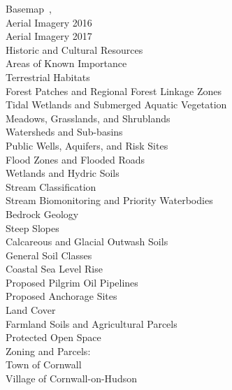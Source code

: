 Basemap\dotfill~\pageref{map:basemap}, ~\pageref{map:basemap}\\
Aerial Imagery 2016\dotfill~\pageref{map:aerialimagery2016}\\
Aerial Imagery 2017\dotfill~\pageref{map:aerialimagery2017}\\
Historic and Cultural 
Resources\dotfill~\pageref{map:historicandculturalresources}\\
Areas of Known Importance\dotfill~\pageref{map:aok}\\
Terrestrial Habitats\dotfill~\pageref{map:terrestrialhabitats}\\
Forest Patches and Regional Forest Linkage 
Zones\dotfill~\pageref{map:forestpatches} \\
Tidal Wetlands and Submerged Aquatic 
Vegetation\dotfill~\pageref{map:tidalwetlandsandSAV}\\
Meadows, Grasslands, and 
Shrublands\dotfill~\pageref{map:meadowgrasslandsandshrublands}\\
Watersheds and Sub-basins\dotfill~\pageref{map:watershedsandsubbasins}\\
Public Wells, Aquifers, and Risk Sites\dotfill~\pageref{map:wells}\\
Flood Zones and Flooded Roads\dotfill~\pageref{map:floodzonesandfloodedroads}\\
Wetlands and Hydric Soils\dotfill~\pageref{map:wetlandsandhydricsoils}\\
Stream Classification\dotfill~\pageref{map:streamclassifications}\\
Stream Biomonitoring and Priority Waterbodies 
\dotfill~\pageref{map:biomonitoringandprioritywaterbodies}\\
Bedrock Geology\dotfill~\pageref{map:bedrockgeology}\\
Steep Slopes\dotfill~\pageref{map:steepslopes}\\
Calcareous and Glacial Outwash Soils \dotfill 
~\pageref{map:calcaerousandglacialoutwashsoils}\\
General Soil Classes\dotfill~\pageref{map:generalsoilclasses}\\
Coastal Sea Level Rise\dotfill~\pageref{map:coastalclimatechange}\\
Proposed Pilgrim Oil Pipelines\dotfill~\pageref{map:proposedoilpipelines}\\
Proposed Anchorage Sites\dotfill~\pageref{map:proposedanchorages}\\
Land Cover\dotfill~\pageref{map:landcover}\\
Farmland Soils and Agricultural Parcels 
\dotfill~\pageref{map:farmlandsoilsandagparcels}\\
Protected Open Space\dotfill~\pageref{map:protectedopenspace} \\
Zoning and Parcels:\\
Town of Cornwall\dotfill~\pageref{map:townzoning}\\
Village of Cornwall-on-Hudson\dotfill~\pageref{map:villagezoning}\\
